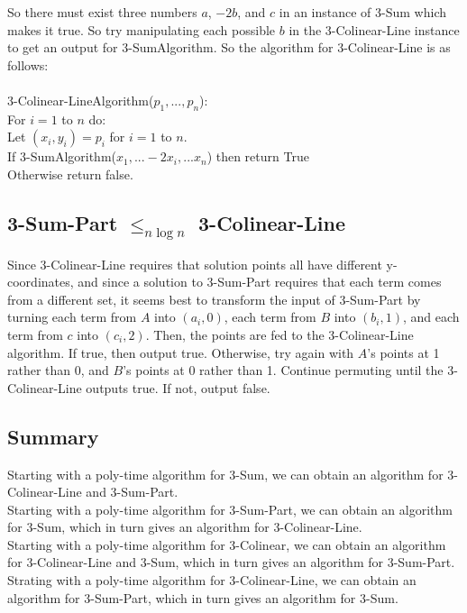 \documentclass[letterpaper,notitlepage,twoside]{article}
\newcommand\tab[1][1cm]{\hspace*{#1}} %
\begin{document}
So there must exist three numbers $a$, $-2b$, and $c$ in an instance of 3-Sum which makes it true. So try manipulating each possible $b$ in the 3-Colinear-Line instance to get an output for 3-SumAlgorithm. So the algorithm for 3-Colinear-Line is as follows:
\\\\
3-Colinear-LineAlgorithm($p_1,...,p_n$):\\
\tab For $i = 1$ to $n$ do:\\
\tab\tab Let $(x_i, y_i) = p_i$ for $i = 1$ to $n$.\\
\tab\tab If 3-SumAlgorithm($x_1,...-2x_i,...x_n$) then return True\\
\tab Otherwise return false.

\subsection*{3-Sum-Part $\leq_{n \log n}$ 3-Colinear-Line}
Since 3-Colinear-Line requires that solution points all have different y-coordinates, and since a solution to 3-Sum-Part requires that each term comes from a different set, it seems best to transform the input of 3-Sum-Part by turning each term from $A$ into $(a_i, 0)$, each term from $B$ into $(b_i, 1)$, and each term from $c$ into $(c_i, 2)$. Then, the points are fed to the 3-Colinear-Line algorithm. If true, then output true. Otherwise, try again with $A$'s points at 1 rather than 0, and $B$'s points at 0 rather than 1. Continue permuting until the 3-Colinear-Line outputs true. If not, output false.

\subsection*{Summary}
Starting with a poly-time algorithm for 3-Sum, we can obtain an algorithm for 3-Colinear-Line and 3-Sum-Part.\\
Starting with a poly-time algorithm for 3-Sum-Part, we can obtain an algorithm for 3-Sum, which in turn gives an algorithm for 3-Colinear-Line.\\
Starting with a poly-time algorithm for 3-Colinear, we can obtain an algorithm for 3-Colinear-Line and 3-Sum, which in turn gives an algorithm for 3-Sum-Part.\\
Strating with a poly-time algorithm for 3-Colinear-Line, we can obtain an algorithm for 3-Sum-Part, which in turn gives an algorithm for 3-Sum.
\end{document}
